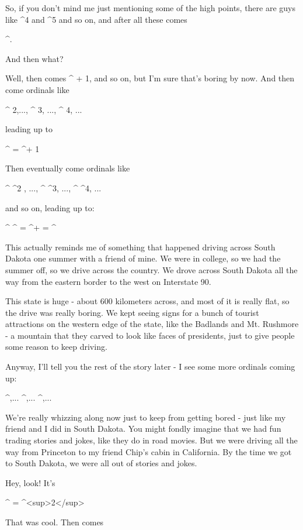 So, if you don't mind me just mentioning some of the high points,
there are guys like \omega ^{4} and \omega ^{5} and so
on, and after all these comes

\omega ^{\omega }.

And then what?

Well, then comes \omega ^{\omega } + 1, and so on, but I'm sure
that's boring by now.  And then come ordinals like 

\omega ^{\omega } 2,..., \omega ^{\omega } 3, ..., \omega ^{\omega } 4, ...

leading up to 

\omega ^{\omega } \omega  = \omega ^{\omega  + 1}

Then eventually come ordinals like

\omega ^{\omega } \omega ^{2} , ..., \omega ^{\omega } \omega ^{3}, ..., \omega ^{\omega } \omega ^{4}, ...

and so on, leading up to:

\omega ^{\omega } \omega ^{\omega } = \omega ^{\omega  + \omega } = \omega ^{}

This actually reminds me of something that happened driving across 
South Dakota one summer with a friend of mine.  We were in college,
so we had the summer off, so we drive across the country.  We drove
across South Dakota all the way from the eastern border to the west
on Interstate 90.  

This state is huge - about 600 kilometers across, and most of it is 
really flat, so the drive was really boring.  We kept seeing signs 
for a bunch of tourist attractions on the western edge of the state, 
like the Badlands and Mt. Rushmore - a mountain that they carved 
to look like faces of presidents, just to give people some reason to keep
driving.  

Anyway, I'll tell you the rest of the story later - I see some more 
ordinals coming up:

\omega ^{},... \omega ^{},... \omega ^{},...

We're really whizzing along now just to keep from getting bored - just
like my friend and I did in South Dakota.  You might fondly imagine
that we had fun trading stories and jokes, like they do in road
movies.  But we were driving all the way from Princeton to my friend
Chip's cabin in California.  By the time we got to South Dakota, we
were all out of stories and jokes.

Hey, look!  It's

\omega ^{\omega  \omega } = \omega ^{\omega <sup>2}</sup>

That was cool.  Then comes 



